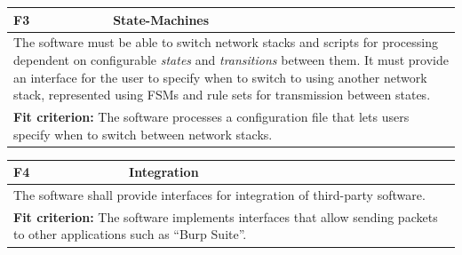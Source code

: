 \begin{center}

    \begin{tabular}{|p{1cm}|p{12cm}|}
        \hline
        \textbf{F3} & \textbf{State-Machines}                                                                                                                                                                                                                                                                                                                                 \\ \hline
        \multicolumn{2}{|p{12cm}|}{The software must be able to switch network stacks and scripts for processing dependent on configurable \emph{states} and \emph{transitions} between them. It must provide an interface for the user to specify when to switch to using another network stack, represented using \acp{FSM} and rule sets for transmission between states.} \\ \hline
        \multicolumn{2}{|p{12cm}|}{\textbf{Fit criterion:} The software processes a configuration file that lets users specify when to switch between network stacks.}                                                                                                                                                                                                        \\ \hline
    \end{tabular}
\end{center}
\begin{center}

    \begin{tabular}{|p{1cm}|p{12cm}|}
        \hline
        \textbf{F4} & \textbf{Integration}                                                                                                                                    \\ \hline
        \multicolumn{2}{|p{12cm}|}{The software shall provide interfaces for integration of third-party software.}                                                            \\ \hline
        \multicolumn{2}{|p{12cm}|}{\textbf{Fit criterion:} The software implements interfaces that allow sending packets to other applications such as \enquote{Burp Suite}.} \\ \hline
    \end{tabular}
\end{center}
